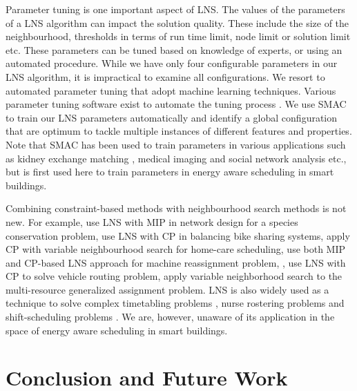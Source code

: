 Parameter tuning is one important aspect of LNS. The values of the parameters of a LNS algorithm can impact the solution quality. These include the size of the neighbourhood, thresholds in terms of run time limit, node limit or solution limit etc. These parameters can be tuned based on knowledge of experts, or using an automated procedure. While we have only four configurable parameters in our LNS algorithm, it is impractical to examine all configurations. We resort to automated parameter tuning that adopt machine learning techniques.  Various parameter tuning software exist to automate the tuning process \citep{thornton2013auto,bergstra2012random, hutter2011sequential}. We use SMAC \citep{hutter2011sequential} to train our LNS parameters automatically and identify a global configuration that are optimum to tackle multiple instances of different features and properties. 
Note that SMAC has been used to train parameters in various applications such as kidney exchange matching \citep{dickerson2015futurematch}, medical imaging \citep{angermueller2016deep} and social network analysis \citep{vaswani2016adaptive} etc., but is first used here to train parameters in energy aware scheduling in smart buildings.

Combining constraint-based methods with neighbourhood search methods is not new. For example, \cite{lebras2013robust} use LNS with MIP in network design for a species conservation problem, \cite{gaspero2013constraint} use LNS with CP in balancing bike sharing systems, \cite{rendl2012hybrid} apply CP with variable neighbourhood search for home-care scheduling, \cite{mehta2012comparing} use both MIP and CP-based LNS approach for machine reassignment problem, \cite{bent2004two}, \cite{kilby2011flexible} use LNS with CP to solve vehicle routing problem, \cite{mitrovicminic09local} apply variable neighborhood search to the multi-resource generalized assignment problem. LNS is also widely used as a technique to solve complex timetabling problems \citep{meyers2006very,abdullah2007investigating,burke2010hybrid}, nurse rostering problems \citep{bilgin2012local} and shift-scheduling problems \citep{quimper2010large}. We are, however, unaware of its application in the space of energy aware scheduling in smart buildings.



\section{Conclusion and Future Work}\label{sec:lns:conclusion}

